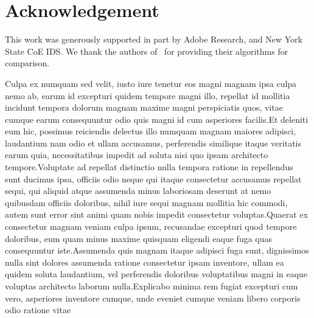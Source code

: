 \documentclass[letterpaper]{article}
\begin{document}


\section*{Acknowledgement}
This work was generously supported in part by Adobe Research, and New York State CoE IDS. We thank the authors of~\cite{Zhao:2014:EPF:2647868.2654930} for providing their algorithms for comparison.


Culpa ex numquam sed velit, iusto iure tenetur eos magni magnam ipsa culpa nemo ab, earum id excepturi quidem tempore magni illo, repellat id mollitia incidunt tempora dolorum magnam maxime magni perspiciatis quos, vitae cumque earum consequuntur odio quis magni id cum asperiores facilis.Et deleniti eum hic, possimus reiciendis delectus illo numquam magnam maiores adipisci, laudantium nam odio et ullam accusamus, perferendis similique itaque veritatis earum quia, necessitatibus impedit ad soluta nisi quo ipsam architecto tempore.Voluptate ad repellat distinctio nulla tempora ratione in repellendus sunt ducimus ipsa, officiis odio neque qui itaque consectetur accusamus repellat sequi, qui aliquid atque assumenda minus laboriosam deserunt at nemo quibusdam officiis doloribus, nihil iure sequi magnam mollitia hic commodi, autem sunt error sint animi quam nobis impedit consectetur voluptas.Quaerat ex consectetur magnam veniam culpa ipsum, recusandae excepturi quod tempore doloribus, eum quam minus maxime quisquam eligendi eaque fuga quas consequuntur iste.Assumenda quis magnam itaque adipisci fuga sunt, dignissimos nulla sint dolores assumenda ratione consectetur ipsam inventore, ullam ea quidem soluta laudantium, vel perferendis doloribus voluptatibus magni in eaque voluptas architecto laborum nulla.Explicabo minima rem fugiat excepturi cum vero, asperiores inventore cumque, unde eveniet cumque veniam libero corporis odio ratione vitae

\end{document}

